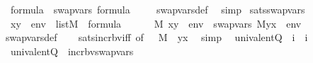 \begin{isabellebody}
\ \ {\isachardoublequoteopen}{\isasymphi}{\isasymin}formula\ {\isasymLongrightarrow}\ swap{\isacharunderscore}{\kern0pt}vars{\isacharparenleft}{\kern0pt}{\isasymphi}{\isacharparenright}{\kern0pt}\ {\isasymin}formula{\isachardoublequoteclose}\ \isanewline
%
\isadelimproof
\ \ %
\endisadelimproof
%
\isatagproof
{}\isamarkupfalse%
\ swap{\isacharunderscore}{\kern0pt}vars{\isacharunderscore}{\kern0pt}def\ \isamarkupfalse%
\ simp%
\endisatagproof
{\isafoldproof}%
%
\isadelimproof
\isanewline
%
\endisadelimproof
\isanewline
{}\isamarkupfalse%
\ sats{\isacharunderscore}{\kern0pt}swap{\isacharunderscore}{\kern0pt}vars\ {\isacharcolon}{\kern0pt}\isanewline
\ \ {\isachardoublequoteopen}{\isacharbrackleft}{\kern0pt}x{\isacharcomma}{\kern0pt}y{\isacharbrackright}{\kern0pt}\ {\isacharat}{\kern0pt}\ env\ {\isasymin}\ list{\isacharparenleft}{\kern0pt}M{\isacharparenright}{\kern0pt}\ {\isasymLongrightarrow}\ {\isasymphi}{\isasymin}formula\ {\isasymLongrightarrow}\ \isanewline
\ \ \ \ M{\isacharcomma}{\kern0pt}\ {\isacharbrackleft}{\kern0pt}x{\isacharcomma}{\kern0pt}y{\isacharbrackright}{\kern0pt}\ {\isacharat}{\kern0pt}\ env\ {\isasymTurnstile}\ swap{\isacharunderscore}{\kern0pt}vars{\isacharparenleft}{\kern0pt}{\isasymphi}{\isacharparenright}{\kern0pt}{\isasymlongleftrightarrow}\ M{\isacharcomma}{\kern0pt}{\isacharbrackleft}{\kern0pt}y{\isacharcomma}{\kern0pt}x{\isacharbrackright}{\kern0pt}\ {\isacharat}{\kern0pt}\ env\ {\isasymTurnstile}\ {\isasymphi}{\isachardoublequoteclose}\isanewline
%
\isadelimproof
\ \ %
\endisadelimproof
%
\isatagproof
{}\isamarkupfalse%
\ swap{\isacharunderscore}{\kern0pt}vars{\isacharunderscore}{\kern0pt}def\isanewline
\ \ \isamarkupfalse%
\ sats{\isacharunderscore}{\kern0pt}incr{\isacharunderscore}{\kern0pt}bv{\isacharunderscore}{\kern0pt}iff\ {\isacharbrackleft}{\kern0pt}of\ {\isacharunderscore}{\kern0pt}\ {\isacharunderscore}{\kern0pt}\ M\ {\isacharunderscore}{\kern0pt}\ {\isachardoublequoteopen}{\isacharbrackleft}{\kern0pt}y{\isacharcomma}{\kern0pt}x{\isacharbrackright}{\kern0pt}{\isachardoublequoteclose}{\isacharbrackright}{\kern0pt}\ \isamarkupfalse%
\ simp%
\endisatagproof
{\isafoldproof}%
%
\isadelimproof
\isanewline
%
\endisadelimproof
\isanewline
{}\isamarkupfalse%
\isanewline
\ \ univalent{\isacharunderscore}{\kern0pt}Q{}\ {\isacharcolon}{\kern0pt}{\isacharcolon}{\kern0pt}\ {\isachardoublequoteopen}i\ {\isasymRightarrow}\ i{\isachardoublequoteclose}\ \isanewline
\ \ {\isachardoublequoteopen}univalent{\isacharunderscore}{\kern0pt}Q{}{\isacharparenleft}{\kern0pt}{\isasymphi}{\isacharparenright}{\kern0pt}\ {\isasymequiv}\ incr{\isacharunderscore}{\kern0pt}bv{}{\isacharparenleft}{\kern0pt}swap{\isacharunderscore}{\kern0pt}vars{\isacharparenleft}{\kern0pt}{\isasymphi}{\isacharparenright}{\kern0pt}{\isacharparenright}{\kern0pt}{\isachardoublequoteclose}\isanewline

\end{isabellebody}
